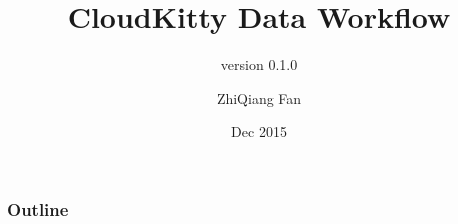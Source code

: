 \documentclass[t,aspectratio=169]{beamer}
\title{CloudKitty Data Workflow}
\subtitle{version 0.1.0}
\author{ZhiQiang Fan}
\institute{Hewlett Packard Enterprise Company}
\date{Dec 2015}
\begin{document}
\begin{frame}
\titlepage
\end{frame}

\begin{frame}
\frametitle{Outline}
\tableofcontents
\end{frame}


\end{document}
